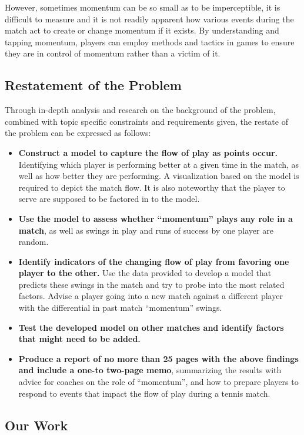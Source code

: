 \documentclass{mcmthesis}
\begin{document}
 However, sometimes momentum can be so small as to be imperceptible, it is difficult to
measure and it is not readily apparent how various events during the match act to create or change
momentum if it exists. By understanding and tapping momentum, players can employ methods
and tactics in games to ensure they are in control of momentum rather than a victim of it.

\subsection{Restatement of the Problem}%
Through in-depth analysis and research on the background of the problem, combined with
topic specific constraints and requirements given, the restate of the problem can be expressed as
follows: 
\begin{itemize}
    \item {\bf Construct a model to capture the flow of play as points occur.} Identifying which player
    is performing better at a given time in the match, as well as how better they are performing. A
    visualization based on the model is required to depict the match flow. It is also noteworthy
    that the player to serve are supposed to be factored in to the model. 
    \item {\bf Use the model to assess whether “momentum” plays any role in a match}, as well as
    swings in play and runs of success by one player are random. 
    \item {\bf Identify indicators of the changing flow of play from favoring one player to the other.} Use the data provided to develop a model that predicts these swings in the match and try to
    probe into the most related factors. Advise a player going into a new match against a
    different player with the differential in past match “momentum” swings.
    \item {\bf Test the developed model on other matches and identify factors that might need to be
    added.}
    \item {\bf Produce a report of no more than 25 pages with the above findings and include a one-to two-page memo}, summarizing the results with advice for coaches on the role of “momentum”, and how to prepare players to respond to events that impact the flow of play
    during a tennis match.
\end{itemize}

\subsection{Our Work}%
\end{document}
